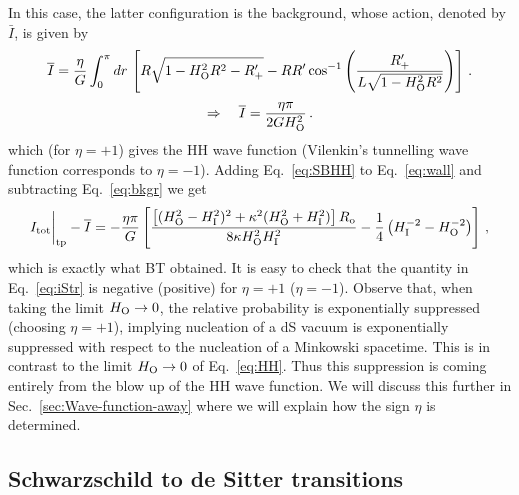 \documentclass[11pt,a4paper]{article}
\begin{document}
In this case, the latter configuration is the background, whose action, denoted by $\bar I$, is given by 
\begin{equation} 
\overline{I} = \frac{\eta}{G}\int_{0}^{\pi} dr \, \left[R \sqrt{1-H_{\rm O}^{2}R^{2}-R^{\prime}_{+}} - R R^{\prime} \cos^{-1}\left(\frac{R^{\prime}_{+}}{L \sqrt{1 - H_{\rm O}^{2}R^2}}\right)\right] \,.
\end{equation} 
\begin{equation} 
\Rightarrow \quad \overline{I} = \frac{\eta \pi}{2G H_{\rm O}^{2}} \,. 
\label{eq:bkgr}  
\end{equation} 
which (for $\eta=+1$) gives the HH wave function (Vilenkin's tunnelling wave function corresponds to $\eta=-1$). Adding Eq.~\eqref{eq:SBHH} to Eq.~\eqref{eq:wall} and subtracting Eq.~\eqref{eq:bkgr} we get
\begin{equation}
I_{\rm tot}\bigg|_{\rm tp} - \overline{I} = -\frac{\eta\pi}{G}\left[\frac{\left[(H_{{\rm
O}}^{2}-H_{{\rm I}}^{2})^{2}+\kappa^{2}(H_{{\rm O}}^{2}+H_{{\rm
I}}^{2})\right] R_{\rm o}}{8\kappa H_{{\rm O}}^{2}H_{{\rm
I}}^{2}}-\frac{1}{4}\left(H_{{\rm I}}^{-2}-H_{{\rm O}}^{-2}\right) \right] \,,
\label{eq:iStr}
\end{equation}
which is exactly what BT obtained. It is easy to check that the quantity in Eq.~\eqref{eq:iStr} is negative (positive) for $\eta = + 1$ ($\eta = - 1$). Observe that, when taking the limit $H_{\rm O} \rightarrow 0$, the relative probability is exponentially suppressed (choosing $\eta = +1$), implying nucleation of a dS vacuum is exponentially suppressed with respect to the nucleation of a Minkowski spacetime. This is in contrast to the limit $H_{\rm O}\rightarrow 0$ of Eq.~\eqref{eq:HH}. Thus this suppression is coming entirely from the blow up of the HH wave function. We will discuss this further in Sec.~\ref{sec:Wave-function-away} where we will explain how the sign $\eta$ is determined. 

\subsection{Schwarzschild to de Sitter transitions}
\label{sec:StodS}
\end{document}
